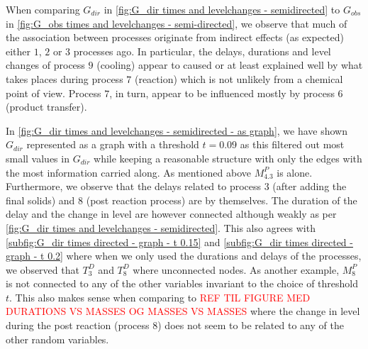 \documentclass[../Thesis.tex]{subfiles}
\begin{document}
When comparing $G_{dir}$ in \autoref{fig:G_dir times and levelchanges - semidirected} to $G_{obs}$ in \autoref{fig:G_obs times and levelchanges - semi-directed}, we observe that much of the association between processes originate from indirect effects (as expected) either $1$, $2$ or $3$ processes ago. In particular, the delays, durations and level changes of process $9$ (cooling) appear to caused or at least explained well by what takes places during process $7$ (reaction) which is not unlikely from a chemical point of view. Process $7$, in turn, appear to be influenced mostly by process $6$ (product transfer).

In \autoref{fig:G_dir times and levelchanges - semidirected - as graph}, we have shown $G_{dir}$ represented as a graph with a threshold $t = 0.09$ as this filtered out most small values in $G_{dir}$ while keeping a reasonable structure with only the edges with the most information carried along. As mentioned above $M^P_{4.3}$ is alone. Furthermore, we observe that the delays related to process $3$ (after adding the final solids) and $8$ (post reaction process) are by themselves. The duration of the delay and the change in level are however connected although weakly as per \autoref{fig:G_dir times and levelchanges - semidirected}. This also agrees with \autoref{subfig:G_dir times directed - graph - t 0.15} and \autoref{subfig:G_dir times directed - graph - t 0.2} where when we only used the durations and delays of the processes, we observed that $T^D_3$ and $T^D_8$ where unconnected nodes. As another example, $M^P_8$ is not connected to any of the other variables invariant to the choice of threshold $t$. This also makes sense when comparing to \textcolor{red}{REF TIL FIGURE MED DURATIONS VS MASSES OG MASSES VS MASSES} where the change in level during the post reaction (process $8$) does not seem to be related to any of the other random variables.
\end{document}
